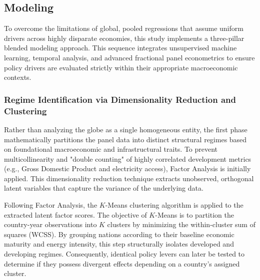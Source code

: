 \documentclass[a4paper,11pt]{article}
\begin{document}
\subsection{Modeling}

To overcome the limitations of global, pooled regressions that assume uniform drivers across highly disparate economies, this study implements a three-pillar blended modeling approach.
This sequence integrates unsupervised machine learning, temporal analysis, and advanced fractional panel econometrics to ensure policy drivers are evaluated strictly within their appropriate macroeconomic contexts.

\subsubsection{Regime Identification via Dimensionality Reduction and Clustering}
Rather than analyzing the globe as a single homogeneous entity, the first phase mathematically partitions the panel data into distinct structural regimes based on foundational macroeconomic and infrastructural traits.
To prevent multicollinearity and "double counting" of highly correlated development metrics (e.g., Gross Domestic Product and electricity access), Factor Analysis is initially applied.
This dimensionality reduction technique extracts unobserved, orthogonal latent variables that capture the variance of the underlying data.

Following Factor Analysis, the $K$-Means clustering algorithm is applied to the extracted latent factor scores.
The objective of $K$-Means is to partition the country-year observations into $K$ clusters by minimizing the within-cluster sum of squares (WCSS).
By grouping nations according to their baseline economic maturity and energy intensity, this step structurally isolates developed and developing regimes.
Consequently, identical policy levers can later be tested to determine if they possess divergent effects depending on a country's assigned cluster.
\end{document}
